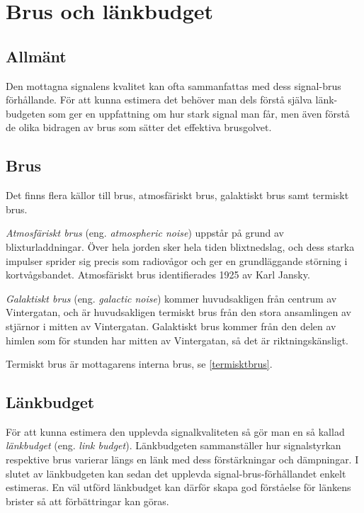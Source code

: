 \section{Brus och länkbudget}

\subsection{Allmänt}

Den mottagna signalens kvalitet kan ofta sammanfattas med dess signal-brus
förhållande.
För att kunna estimera det behöver man dels förstå själva länk-budgeten som
ger en uppfattning om hur stark signal man får, men även förstå de olika
bidragen av brus som sätter det effektiva brusgolvet.

\subsection{Brus}

Det finns flera källor till brus, atmosfäriskt brus, galaktiskt brus samt
termiskt brus.

\emph{Atmosfäriskt brus} (eng. \emph{atmospheric noise}) uppstår på grund av
blixturladdningar.
Över hela jorden sker hela tiden blixtnedslag, och dess starka impulser sprider
sig precis som radiovågor och ger en grundläggande störning i kortvågsbandet.
Atmosfäriskt brus identifierades 1925 av Karl Jansky.

\emph{Galaktiskt brus} (eng. \emph{galactic noise}) kommer huvudsakligen från
centrum av Vintergatan, och är huvudsakligen termiskt brus från den stora
ansamlingen av stjärnor i mitten av Vintergatan.
Galaktiskt brus kommer från den delen av himlen som för stunden har mitten av
Vintergatan, så det är riktningskänsligt.

Termiskt brus är mottagarens interna brus, se \ref{termisktbrus}.

\subsection{Länkbudget}

För att kunna estimera den upplevda signalkvaliteten så gör man en så kallad
\emph{länkbudget} (eng. \emph{link budget}).
Länkbudgeten sammanställer hur signalstyrkan respektive brus varierar längs en
länk med dess förstärkningar och dämpningar.
I slutet av länkbudgeten kan sedan det upplevda signal-brus-förhållandet
enkelt estimeras.
En väl utförd länkbudget kan därför skapa god förståelse för länkens brister
så att förbättringar kan göras.

